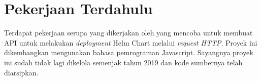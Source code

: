 \section{Pekerjaan Terdahulu}
\label{sec:prevWork}

Terdapat pekerjaan serupa yang dikerjakan oleh \cite{microsoft_2019} yang mencoba untuk membuat API untuk melakukan \textit{deployment} Helm Chart melalui \textit{request HTTP}. Proyek ini dikembangkan mengunakan bahasa pemrograman Javascript. Sayangnya proyek ini sudah tidak lagi dikelola semenjak tahun 2019 dan kode sumbernya telah diarsipkan. 